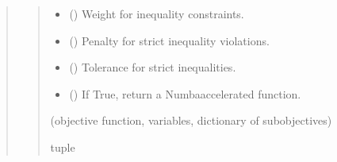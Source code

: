 \documentclass[letterpaper,10pt,english]{sphinxmanual}
\begin{document}
\begin{quote}
\begin{fulllineitems}
\begin{fulllineitems}
\begin{quote}
\begin{description}
\begin{itemize}
\item {} 
\sphinxAtStartPar
{} () \textendash{} Weight for inequality constraints.

\item {} 
\sphinxAtStartPar
{} () \textendash{} Penalty for strict inequality violations.

\item {} 
\sphinxAtStartPar
{} () \textendash{} Tolerance for strict inequalities.

\item {} 
\sphinxAtStartPar
{} () \textendash{} If True, return a Numba\sphinxhyphen{}accelerated function.

\end{itemize}

\sphinxAtStartPar
(objective function, variables, dictionary of sub\sphinxhyphen{}objectives)

\sphinxAtStartPar
tuple

\end{description}\end{quote}

\end{fulllineitems}


\begin{fulllineitems}
\label{\detokenize{pygeox:pygeox.solver.SolverNamespace.has_any_overlapping_points}}
\pysigstartsignatures
\pysiglinewithargsret
{}
{}
{}
\pysigstopsignatures
\end{fulllineitems}



\end{fulllineitems}
\end{quote}
\end{document}
